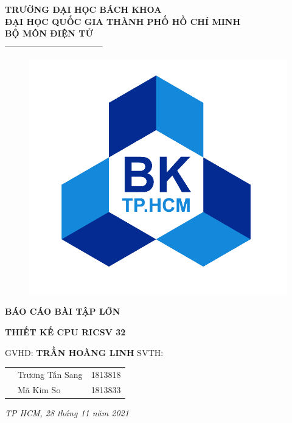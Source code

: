 \documentclass[E:/Latex/ExtraWork/ComputerArchitechture/Report.tex]{subfiles}
\begin{document}
	\pagestyle{empty}
	\begin{center}
		\large \textbf{TRƯỜNG ĐẠI HỌC BÁCH KHOA} \\ 
		\large \textbf{ĐẠI HỌC QUỐC GIA THÀNH PHỐ HỒ CHÍ MINH} \\
		\large \textbf{BỘ MÔN ĐIỆN TỬ}	\\
		-----------------------------------	\\
		\vspace{1cm}
		\begin{figure}[h!]
			\includegraphics[scale = 0.7]{Figure/LogoBK.png}
			\centering
		\end{figure}	
		\vspace{1.5cm}
		\textbf{\Large BÁO CÁO BÀI TẬP LỚN}

		\vspace{1cm}
		\textbf{\LARGE THIẾT KẾ CPU RICSV 32}
	\end{center}

	\vspace{0.5cm}
	\begin{flushleft}
		\large GVHD: \textbf{TRẦN HOÀNG LINH} 
		\newline
		\newline
		\Large SVTH:	\\
			\begin{table}[!ht]
			\begin{tabular}{lll}
			 & Trương Tấn Sang & 1813818 \\
			 & Mã Kim So       & 1813833
			\end{tabular}
			\end{table}
	\end{flushleft}

	\begin{center}
		\vspace{5cm}
		\Large \textit{TP HCM, 28 tháng 11 năm 2021}
	\end{center}
	\newpage
\end{document}

